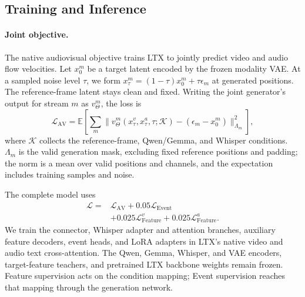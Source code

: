 \subsection{Training and Inference}
\label{sec:training}
\paragraph{Joint objective.}
The native audiovisual objective trains LTX to jointly predict video and
audio flow velocities. Let $x_0^m$ be a target latent encoded by the frozen
modality VAE. At a sampled noise level $\tau$, we form
$x_\tau^m=(1-\tau)x_0^m+\tau\epsilon_m$ at generated positions.
The reference-frame latent stays clean and fixed. Writing the joint
generator's output for stream $m$ as $v_\Theta^m$, the loss is
\begin{equation}
 \mathcal L_{\mathrm{AV}}=
 \mathbb E\!\left[
 \sum_m
 \big\|v_\Theta^m(x_\tau^v,x_\tau^a,\tau;\mathcal K)
       -(\epsilon_m-x_0^m)\big\|_{\Lambda_m}^{2}\right],
\label{eq:av}
\end{equation}
where $\mathcal K$ collects the reference-frame, Qwen/Gemma, and Whisper
conditions. $\Lambda_m$ is the valid generation mask, excluding fixed
reference positions and padding; the norm is a mean over valid positions
and channels, and the expectation includes training samples and noise.

The complete model uses
\begin{equation}
\begin{split}
 \mathcal L ={}& \mathcal L_{\mathrm{AV}}
       +0.05\mathcal L_{\mathrm{Event}}\\
       &+0.025\mathcal L_{\mathrm{Feature}}^v
        +0.025\mathcal L_{\mathrm{Feature}}^a.
\end{split}
\label{eq:total}
\end{equation}
We train the connector, Whisper adapter and attention branches, auxiliary
feature decoders, event heads, and LoRA adapters in LTX's native video and
audio text cross-attention. The Qwen, Gemma, Whisper, and VAE encoders,
target-feature teachers, and pretrained LTX backbone weights remain
frozen. Feature supervision acts on the condition mapping; Event
supervision reaches that mapping through the generation network.

